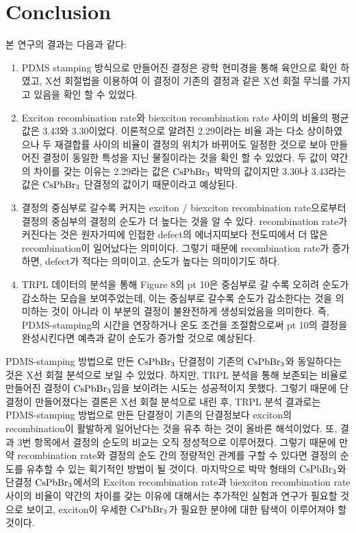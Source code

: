 \newpage

\section{Conclusion}
본 연구의 결과는 다음과 같다:
\begin{enumerate} 
	\item PDMS stamping 방식으로 만들어진 결정은 광학 현미경을 통해 육안으로 확인 하였고, X선 회절법을 이용하여 이 결정이 기존의 결정과 같은 X선 회절 무늬를 가지고 있음을 확인 할 수 있었다.
	\item	
	Exciton recombination rate와 biexciton recombination rate 사이의 비율의 평균값은 3.43와 3.30이었다. 이론적으로 알려진 2.29이라는 비율\cite{chen2018room} 과는 다소 상이하였으나 두 재결합률 사이의 비율이 결정의 위치가 바뀌어도 일정한 것으로 보아 만들어진 결정이 동일한 특성을 지닌 물질이라는 것을 확인 할 수 있었다. 두 값이 약간의 차이를 갖는 이유는 2.29라는 값은 $\rm{CsPbBr_3}$ 박막의 값이지만 3.30나 3.43라는 값은 $\rm{CsPbBr_3}$ 단결정의 값이기 때문이라고 예상된다.  
	\item 결정의 중심부로 갈수록 커지는 exciton / biexciton recombination rate으로부터 결정의 중심부의 결정의 순도가 더 높다는 것을 알 수 있다. recombination rate가 커진다는 것은 원자가띠에 인접한 defect의 에너지띠보다 전도띠에서 더 많은 recombination이 일어났다는 의미이다. 그렇기 때문에 recombination rate가 증가하면, defect가 적다는 의미이고, 순도가 높다는 의미이기도 하다.
	\item TRPL 데이터의 분석을 통해 Figure 8의 pt 10은 중심부로 갈 수록 오히려 순도가 감소하는 모습을 보여주었는데, 이는 중심부로 갈수록 순도가 감소한다는 것을 의미하는 것이 아니라 이 부분의 결정이 불완전하게 생성되었음을 의미한다. 즉, PDMS-stamping의 시간을 연장하거나 온도 조건을 조절함으로써 pt 10의 결정을 완성시킨다면 예측과 같이 순도가 증가할 것으로 예상된다. 
\end{enumerate}
PDMS-stamping 방법으로 만든 $\rm{CsPbBr_3}$ 단결정이 기존의 $\rm{CsPbBr_3}$와 동일하다는 것은 X선 회절 분석으로 보일 수 있었다. 하지만, TRPL 분석을 통해 보존되는 비율로 만들어진 결정이 $\rm{CsPbBr_3}$임을 보이려는 시도는 성공적이지 못했다. 그렇기 때문에 단결정이 만들어졌다는 결론은 X선 회절 분석으로 내린 후, TRPL 분석 결과로는 PDMS-stamping 방법으로 만든 단결정이 기존의 단결정보다 exciton의 recombination이 활발하게 일어난다는 것을 유추 하는 것이 올바른 해석이었다.  
또, 결과 3번 항목에서 결정의 순도의 비교는 오직 정성적으로 이루어졌다. 그렇기 때문에 만약 recombination rate와 결정의 순도 간의 정량적인 관계를 구할 수 있다면 결정의 순도를 유추할 수 있는 획기적인 방법이 될 것이다.
마지막으로 박막 형태의 $\rm{CsPbBr_3}$와 단결정 $\rm{CsPbBr_3}$에서의 Exciton recombination rate과 biexciton recombination rate 사이의 비율이 약간의 차이를 갖는 이유에 대해서는 추가적인 실험과 연구가 필요할 것으로 보이고, exciton이 우세한 $\rm{CsPbBr_3}$가 필요한 분야에 대한 탐색이 이루어져야 할 것이다. 



